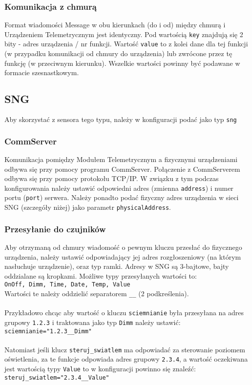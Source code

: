 \documentclass[11pt]{article}
\begin{document}
\subsubsection{Komunikacja z chmurą}
Format wiadomości Message w obu kierunkach (do i od) między chmurą i Urządzeniem Telemetrycznym jest identyczny.
Pod wartością \verb|key| znajdują się 2 bity - adres urządzenia / nr funkcji. Wartość \verb|value| to z kolei dane
dla tej funkcji (w przypadku komunikacji od chmury do urządzenia) lub zwrócone przez tę funkcję (w przeciwnym kierunku).
Wszelkie wartości powinny być podawane w formacie szesnastkowym.


\subsection{SNG}
Aby skorzystać z sensora tego typu, należy w konfiguracji podać jako typ \verb|sng|
\subsubsection{CommServer}
Komunikacja pomiędzy Modułem Telemetrycznym a fizycznymi urządzeniami odbywa się przy pomocy
programu CommServer. Połączenie z CommServerem odbywa się przy pomocy protokołu TCP/IP.
W związku z tym podczas konfigurowania należy ustawić odpowiedni adres (zmienna \verb|address|)
i numer portu (\verb|port|) serwera. Należy ponadto podać fizyczny adres urządzenia w sieci 
SNG (szczegóły niżej) jako parametr \verb|physicalAddress|.

\subsubsection{Przesyłanie do czujników}
Aby otrzymaną od chmury wiadomość o pewnym kluczu przesłać do fizycznego urządzenia,
należy ustawić odpowiadający jej adres rozgłoszeniowy (na którym nasłuchuje urządzenie), 
oraz typ ramki. Adresy w SNG są 3-bajtowe, bajty oddzialane są kropkami. 
Możliwe typy przesyłanych wartości to:\\
\verb|OnOff, Dimm, Time, Date, Temp, Value|\\
Wartości te należy oddzielić separatorem \verb|__| (2 podkreślenia).\\
\\
Przykładowo chcąc aby wartość o kluczu \verb|sciemnianie| była przesyłana na adres
grupowy \verb|1.2.3| i traktowana jako typ \verb|Dimm| należy ustawić:\\
\verb|sciemnianie="1.2.3__Dimm"|\\
\\
Natomiast jeśli klucz \verb|steruj_swiatlem| ma odpowiadać za sterowanie poziomem oświetlenia,
za te funkcje odpowiada adres grupowy \verb|2.3.4|, a wartość oczekiwana jest wartością typy
\verb|Value| to w konfiguracji powinno się znaleźć:\\
\verb|steruj_swiatlem="2.3.4__Value"|\\
\end{document}

